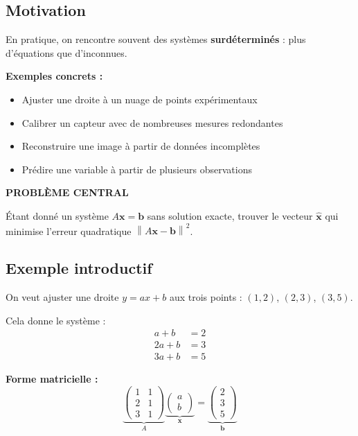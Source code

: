 \documentclass[12pt,a4paper]{article}
\newcommand{\norm}[1]{\left\| #1 \right\|}
\begin{document}
\subsection{Motivation}

En pratique, on rencontre souvent des systèmes \textbf{surdéterminés} : plus d'équations que d'inconnues.

\textbf{Exemples concrets :}
\begin{itemize}
    \item Ajuster une droite à un nuage de points expérimentaux
    \item Calibrer un capteur avec de nombreuses mesures redondantes
    \item Reconstruire une image à partir de données incomplètes
    \item Prédire une variable à partir de plusieurs observations
\end{itemize}

\begin{resultatbox}
\begin{center}
\textbf{\textcolor{bleu}{PROBLÈME CENTRAL}}

Étant donné un système $A\mathbf{x} = \mathbf{b}$ sans solution exacte, trouver le vecteur $\hat{\mathbf{x}}$ qui minimise l'erreur quadratique $\norm{A\mathbf{x} - \mathbf{b}}^2$.
\end{center}
\end{resultatbox}

\subsection{Exemple introductif}

On veut ajuster une droite $y = ax + b$ aux trois points : $(1, 2)$, $(2, 3)$, $(3, 5)$.

Cela donne le système :
\begin{align*}
a + b &= 2 \\
2a + b &= 3 \\
3a + b &= 5
\end{align*}

\textbf{Forme matricielle :}
\[
\underbrace{\begin{pmatrix} 1 & 1 \\ 2 & 1 \\ 3 & 1 \end{pmatrix}}_{A}
\underbrace{\begin{pmatrix} a \\ b \end{pmatrix}}_{\mathbf{x}}
= \underbrace{\begin{pmatrix} 2 \\ 3 \\ 5 \end{pmatrix}}_{\mathbf{b}}
\]
\end{document}
